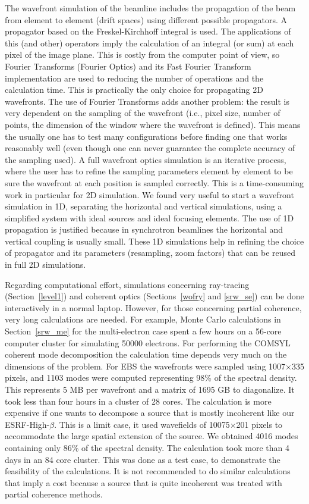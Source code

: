 \documentclass{iucr}              %
\newcommand{\inred}[1]{{\color{black}#1}}
\begin{document}
The wavefront simulation of the beamline includes the propagation of the beam from element to element (drift spaces) using different possible propagators. A propagator based on the Freskel-Kirchhoff integral is used. The applications of this (and other) operators imply the calculation of an integral (or sum) at each pixel of the image plane. This is costly from the computer point of view, so Fourier Transforms (Fourier Optics) and its Fast Fourier Transform implementation are used to reducing the number of operations and the calculation time. This is practically the only choice for propagating 2D wavefronts. The use of Fourier Transforms adds another problem: the result is very dependent on the sampling of the wavefront (i.e., pixel size, number of points, the dimension of the window where the wavefront is defined). This means the usually one has to test many configurations before finding one that works reasonably well (even though one can never guarantee the complete accuracy of the sampling used). A full wavefront optics simulation is an iterative process, where the user has to refine the sampling parameters element by element to be sure the wavefront at each position is sampled correctly. This is a time-consuming work in particular for 2D simulation. We found very useful to start a wavefront simulation in 1D, separating the horizontal and vertical simulations, using a simplified system with ideal sources and ideal focusing elements. The use of 1D propagation is justified because in synchrotron beamlines the horizontal and vertical coupling is usually small. These 1D simulations help in refining the choice of propagator and its parameters (resampling, zoom factors) that can be reused in full 2D simulations.

Regarding computational effort, simulations concerning ray-tracing (Section~\ref{level1}) and coherent optics (Sections~\ref{wofry} and \ref{srw_se}) can be done interactively in a normal laptop. However, for those concerning partial coherence, very long calculations are needed. For example, Monte Carlo calculations in Section~\ref{srw_me} for the multi-electron case spent a few hours on a 56-core computer cluster for simulating 50000 electrons. For performing the COMSYL coherent mode decomposition the calculation time depends very much on the dimensions of the problem. For EBS the wavefronts were sampled using 1007$\times$335 pixels, and 1103 modes were computed representing 98\% of the spectral density. This represents 5 MB per wavefront and a matrix of 1695 GB to diagonalize. It took less than four hours in a cluster of 28 cores. The calculation is more expensive if one wants to decompose a source that is \inred{mostly} incoherent like our ESRF-High-$\beta$. This is a limit case, it used wavefields of 10075$\times$201 pixels to accommodate the large spatial extension of the source. We obtained 4016 modes \inred{containing} only 86\% of the spectral density.  The calculation took more than 4 days in an 84 core cluster. This was done as a test case, to demonstrate the feasibility of the calculations. It is not recommended to do similar calculations that imply a cost because a source that is quite incoherent was treated with partial coherence methods. 
\end{document}
